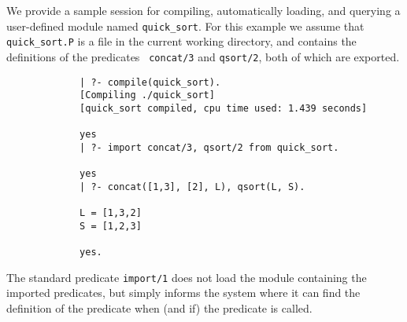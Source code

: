 

We provide a sample session for compiling, automatically loading, and
querying a user-defined module named {\tt quick\_sort}.  For this
example we assume that {\tt quick\_sort.P} is a file in the current
working directory, and contains the definitions of the predicates {\tt
  concat/3} and {\tt qsort/2}, both of which are exported.

{\footnotesize
\begin{verbatim}
             | ?- compile(quick_sort).
             [Compiling ./quick_sort]
             [quick_sort compiled, cpu time used: 1.439 seconds]

             yes
             | ?- import concat/3, qsort/2 from quick_sort. 

             yes
             | ?- concat([1,3], [2], L), qsort(L, S).

             L = [1,3,2]
             S = [1,2,3]

             yes.
\end{verbatim}
}

The standard predicate {\tt import/1} does not load the module 
containing the imported predicates, but simply informs the system 
where it can find the definition of the predicate when (and if) the
predicate is called.


